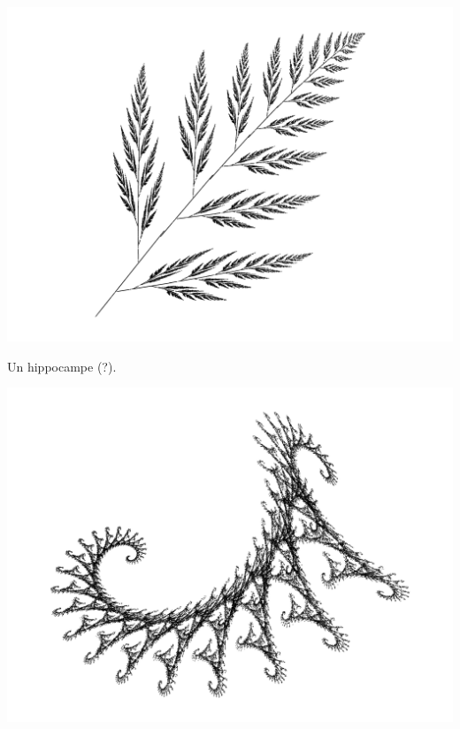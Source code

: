 \documentclass[11pt,class=report,crop=false]{standalone}
\begin{document}
\begin{center}
\includegraphics[scale=\myscale,scale=0.6]{figures/ifs-05}
\end{center}

\medskip

Un hippocampe (?). 
\begin{center}
\includegraphics[scale=\myscale,scale=0.6]{figures/ifs-06}
\end{center}
\end{document}
